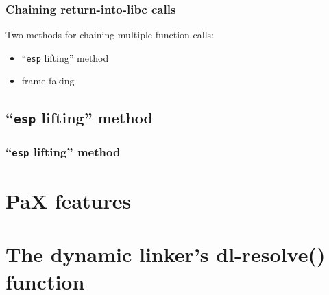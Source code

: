 \documentclass{beamer}
\begin{document}
\begin{frame}
  \frametitle{Chaining return-into-libc calls}
  Two methods for chaining multiple function calls:
  \begin{itemize}
    \item ``\texttt{esp} lifting'' method
    \item frame faking
  \end{itemize}
\end{frame}

\subsection{``\texttt{esp} lifting'' method}

\begin{frame}
  \frametitle{``\texttt{esp} lifting'' method}

\end{frame}


\section{PaX features}  %





\section{The dynamic linker's dl-resolve() function}  %
\end{document}
